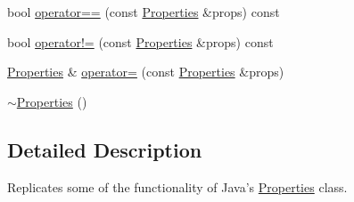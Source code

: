 \begin{DoxyCompactItemize}
\item 
bool \hyperlink{classBUSBOY_1_1Properties_a204c8eeb5b11ea86f4e0a9e6547acc18}{operator==} (const \hyperlink{classBUSBOY_1_1Properties}{Properties} \&props) const 
\item 
bool \hyperlink{classBUSBOY_1_1Properties_a6c35922ee8218fcff503aef635ffe5b6}{operator!=} (const \hyperlink{classBUSBOY_1_1Properties}{Properties} \&props) const 
\item 
\hyperlink{classBUSBOY_1_1Properties}{Properties} \& \hyperlink{classBUSBOY_1_1Properties_ada376798f2cd01b580e41e8958a7a725}{operator=} (const \hyperlink{classBUSBOY_1_1Properties}{Properties} \&props)
\item 
\hyperlink{classBUSBOY_1_1Properties_a041ebc66c0d7fc30cc9464b70826b94e}{$\sim$Properties} ()
\end{DoxyCompactItemize}


\subsection{Detailed Description}
Replicates some of the functionality of Java's \hyperlink{classBUSBOY_1_1Properties}{Properties} class. 

